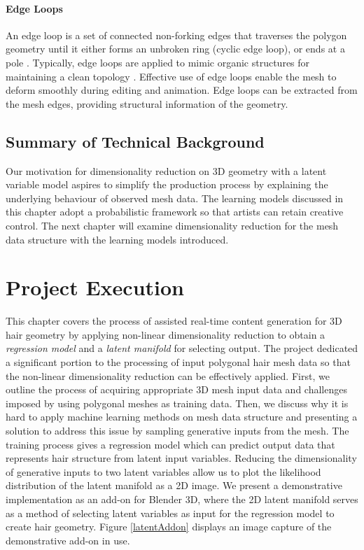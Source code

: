 \documentclass[ %
author={Dillon Keith Diep},
supervisor={Dr. Carl Henrik Ek},
degree={MEng},
title={ART-CG Hair:},
subtitle={Assisted Real-time Content Generation of Stylised Virtual Hair},
type={Research},
year={2017} ]{dissertation}
\begin{document}
\subsubsection{Edge Loops}
An edge loop is a set of connected non-forking edges that traverses the polygon geometry until it either forms an unbroken ring (cyclic edge loop), or ends at a pole \cite[p.93]{blenderstudio}. Typically, edge loops are applied to mimic organic structures for maintaining a clean topology \cite[pp.10-12]{edgeloops}. Effective use of edge loops enable the mesh to deform smoothly during editing and animation. Edge loops can be extracted from the mesh edges, providing structural information of the geometry.

\section{Summary of Technical Background}
Our motivation for dimensionality reduction on 3D geometry with a latent variable model aspires to simplify the production process by explaining the underlying behaviour of observed mesh data. The learning models discussed in this chapter adopt a probabilistic framework so that artists can retain creative control. The next chapter will examine dimensionality reduction for the mesh data structure with the learning models introduced.

\chapter{Project Execution}
\label{chap:execution}

This chapter covers the process of assisted real-time content generation for 3D hair geometry by applying non-linear dimensionality reduction to obtain a \textit{regression model} and a \textit{latent manifold} for selecting output. The project dedicated a significant portion to the processing of input polygonal hair mesh data so that the non-linear dimensionality reduction can be effectively applied. First, we outline the process of acquiring appropriate 3D mesh input data and challenges imposed by using polygonal meshes as training data. Then, we discuss why it is hard to apply machine learning methods on mesh data structure and presenting a solution to address this issue by sampling generative inputs from the mesh. The training process gives a regression model which can predict output data that represents hair structure from latent input variables. Reducing the dimensionality of generative inputs to two latent variables allow us to plot the likelihood distribution of the latent manifold as a 2D image. We present a demonstrative implementation as an add-on for Blender 3D, where the 2D latent manifold serves as a method of selecting latent variables as input for the regression model to create hair geometry. Figure \ref{latentAddon} displays an image capture of the demonstrative add-on in use.
\end{document}

